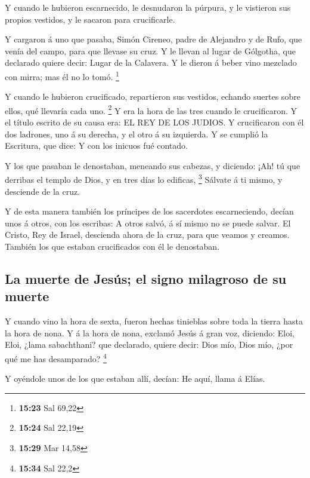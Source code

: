  Y cuando le hubieron escarnecido, le desnudaron la
púrpura, y le vistieron sus propios vestidos, y le sacaron para
crucificarle.

 Y cargaron á uno que pasaba, Simón Cireneo, padre de
Alejandro y de Rufo, que venía del campo, para que llevase su cruz.
 Y le llevan al lugar de Gólgotha, que declarado quiere
decir: Lugar de la Calavera.  Y le dieron á beber vino
mezclado con mirra; mas él no lo tomó. \footnote{\textbf{15:23} Sal
  69,22}

 Y cuando le hubieron crucificado, repartieron sus
vestidos, echando suertes sobre ellos, qué llevaría cada uno.
\footnote{\textbf{15:24} Sal 22,19}  Y era la hora de las
tres cuando le crucificaron.  Y el título escrito de su
causa era: EL REY DE LOS JUDIOS.  Y crucificaron con él
dos ladrones, uno á su derecha, y el otro á su izquierda.
 Y se cumplió la Escritura, que dice: Y con los inicuos
fué contado.

 Y los que pasaban le denostaban, meneando sus cabezas, y
diciendo: ¡Ah! tú que derribas el templo de Dios, y en tres días lo
edificas, \footnote{\textbf{15:29} Mar 14,58}  Sálvate á
ti mismo, y desciende de la cruz.

 Y de esta manera también los príncipes de los sacerdotes
escarneciendo, decían unos á otros, con los escribas: A otros salvó, á
sí mismo no se puede salvar.  El Cristo, Rey de Israel,
descienda ahora de la cruz, para que veamos y creamos. También los que
estaban crucificados con él le denostaban.

\hypertarget{la-muerte-de-jesuxfas-el-signo-milagroso-de-su-muerte}{%
\subsection{La muerte de Jesús; el signo milagroso de su
muerte}\label{la-muerte-de-jesuxfas-el-signo-milagroso-de-su-muerte}}

 Y cuando vino la hora de sexta, fueron hechas tinieblas
sobre toda la tierra hasta la hora de nona.  Y á la hora
de nona, exclamó Jesús á gran voz, diciendo: Eloi, Eloi, ¿lama
sabachthani? que declarado, quiere decir: Dios mío, Dios mío, ¿por qué
me has desamparado? \footnote{\textbf{15:34} Sal 22,2}

 Y oyéndole unos de los que estaban allí, decían: He
aquí, llama á Elías.

